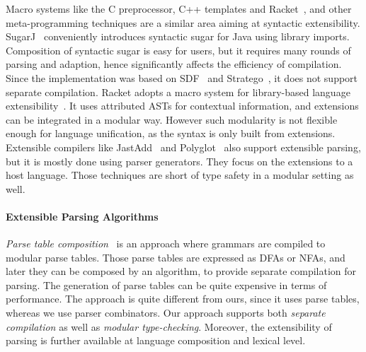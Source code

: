 Macro systems like the C preprocessor, C++ templates and
Racket~\cite{Tobin-Hochstadt2011}, and other meta-programming
techniques are a similar area aiming at syntactic extensibility.
SugarJ~\cite{Erdweg2011} conveniently introduces syntactic sugar for
Java using library imports. Composition of syntactic sugar is easy for
users, but it requires many rounds of parsing and adaption, hence
significantly affects the efficiency of compilation. Since the
implementation was based on SDF~\cite{Heering1989} and
Stratego~\cite{Visser2001}, it does not support separate
compilation. Racket adopts a macro system for library-based language
extensibility~\cite{Tobin-Hochstadt2011}. It uses
attributed ASTs for contextual
information, and extensions can be integrated in a modular
way. However such modularity is not flexible enough for language
unification, as the syntax is only built from extensions.
Extensible
compilers like JastAdd~\cite{Ekman2007} and
Polyglot~\cite{Nystrom2003} also support extensible parsing, but it
is mostly done using parser generators. They focus on the
extensions to a host language. Those techniques are short of type safety in a modular
setting as well.


\paragraph{Extensible Parsing Algorithms}
\textit{Parse table composition}~\cite{bravenboer2008parse}
is an approach where grammars are compiled to
modular parse tables. Those parse tables are expressed as DFAs
or NFAs, and later they can be composed by an algorithm, to provide
separate compilation for parsing. The generation of parse tables can
be quite expensive in terms of performance. The approach
is quite different from ours, since it uses parse
 tables, whereas we use parser combinators.
Our approach supports both
\emph{separate compilation} as well as \emph{modular
  type-checking}. Moreover, the extensibility of parsing is further
available at language composition and lexical level.

